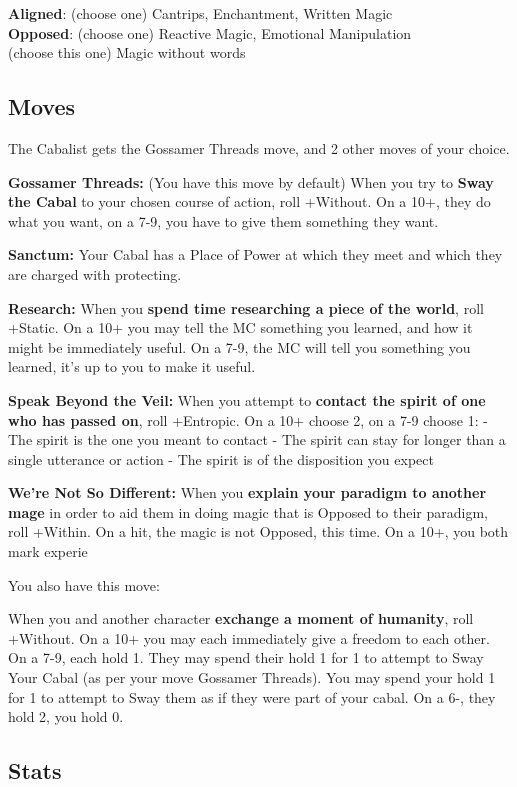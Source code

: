 \documentclass[10pt,twoside,openright]{memoir}
\begin{document}
\textbf{Aligned}: (choose one) Cantrips, Enchantment, Written Magic\\
\textbf{Opposed}: (choose one) Reactive Magic, Emotional Manipulation\\
(choose this one) Magic without words

\hypertarget{moves}{%
\subsection{Moves}\label{moves}}

The Cabalist gets the Gossamer Threads move, and 2 other moves of your
choice.

\textbf{Gossamer Threads:} (You have this move by default) When you try
to \textbf{Sway the Cabal} to your chosen course of action, roll
+Without. On a 10+, they do what you want, on a 7-9, you have to give
them something they want.

\textbf{Sanctum:} Your Cabal has a Place of Power at which they meet and
which they are charged with protecting.

\textbf{Research:} When you \textbf{spend time researching a piece of
the world}, roll +Static. On a 10+ you may tell the MC something you
learned, and how it might be immediately useful. On a 7-9, the MC will
tell you something you learned, it's up to you to make it useful.

\textbf{Speak Beyond the Veil:} When you attempt to \textbf{contact the
spirit of one who has passed on}, roll +Entropic. On a 10+ choose 2, on
a 7-9 choose 1: - The spirit is the one you meant to contact - The
spirit can stay for longer than a single utterance or action - The
spirit is of the disposition you expect

\textbf{We're Not So Different:} When you \textbf{explain your paradigm
to another mage} in order to aid them in doing magic that is Opposed to
their paradigm, roll +Within. On a hit, the magic is not Opposed, this
time. On a 10+, you both mark experie

You also have this move:

When you and another character \textbf{exchange a moment of humanity},
roll +Without. On a 10+ you may each immediately give a freedom to each
other. On a 7-9, each hold 1. They may spend their hold 1 for 1 to
attempt to Sway Your Cabal (as per your move Gossamer Threads). You may
spend your hold 1 for 1 to attempt to Sway them as if they were part of
your cabal. On a 6-, they hold 2, you hold 0.

\hypertarget{stats-1}{%
\subsection{Stats}\label{stats-1}}
\end{document}
